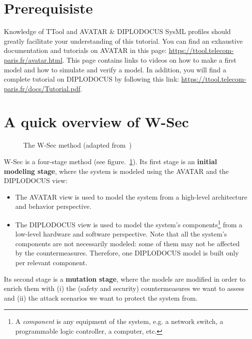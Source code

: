 \documentclass{article}
\begin{document}
\section{Prerequisiste}

Knowledge of TTool and AVATAR \& DIPLODOCUS SysML profiles should greatly facilitate your understanding of this tutorial. 
You can find an exhaustive documentation and tutorials on AVATAR in this page: \url{https://ttool.telecom-paris.fr/avatar.html}. 
This page contains links to videos on how to make a first model and how to simulate and verify a model.
In addition, you will find a complete tutorial on DIPLODOCUS by following this link: \url{https://ttool.telecom-paris.fr/docs/Tutorial.pdf}.



\section{A quick overview of W-Sec}

\begin{figure}[t]
	\hspace*{-2cm}
	\centering
	
	\caption{The W-Sec method (adapted from~\cite{wsec})}
	\label{fig:method}
\end{figure}

W-Sec is a four-stage method (see figure.~\ref{fig:method}). Its first stage is an \textbf{initial modeling stage}, where the system is modeled using the AVATAR and the DIPLODOCUS view:
\begin{itemize}
	\item The AVATAR view is used to model the system from a high-level architecture and behavior perspective.
	\item The DIPLODOCUS view is used to model the system's components\footnote{A \emph{component} is any equipment of the system, e.g. a network switch, a programmable logic controller, a computer, etc.} from a low-level hardware and software perspective. Note that all the system's components are not necessarily modeled: some of them may not be affected by the countermeasures. Therefore, one DIPLODOCUS model is built only per relevant component.
\end{itemize}

Its second stage is a \textbf{mutation stage}, where the models are modified in order to enrich them with (i) the (safety and security) countermeasures we want to assess and (ii) the attack scenarios we want to protect the system from.
\end{document}
